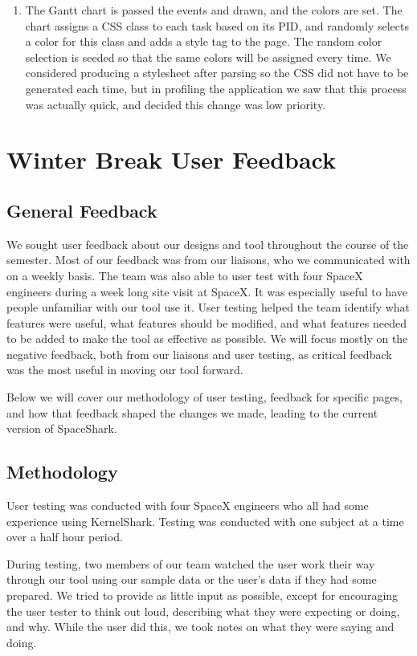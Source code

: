 \documentclass{hmcclinic}
\begin{document}
\begin{enumerate}
   \item The Gantt chart is passed the events and drawn, and the colors are set.
     The chart assigns a CSS class to each task based on its PID, and randomly
     selects a color for this class and adds a style tag to the page. The random
     color selection is seeded so that the same colors will be assigned every
     time. We considered producing a stylesheet after parsing so the CSS did not have
     to be generated each time, but in profiling the application we saw that
     this process was actually quick, and decided this change was low
     priority.

  \end{enumerate}


\chapter{Winter Break User Feedback} %
\section{General Feedback} %
We sought user feedback about our designs and tool throughout the course of the
semester. Most of our feedback was from our liaisons, who we communicated with
on a weekly basis. The team was also able to user test with four SpaceX
engineers during a week long site visit at SpaceX. It was especially useful to
have people unfamiliar with our tool use it.  User testing helped the team
identify what features were useful, what features should be modified, and what
features needed to be added to make the tool as effective as possible.  We will
focus mostly on the negative feedback, both from our liaisons and user testing,
as critical feedback was the most useful in moving our tool forward.

Below we will cover our methodology of user testing, feedback for specific
pages, and how that feedback shaped the changes we made, leading to the current
version of SpaceShark.

\section{Methodology} %
User testing was conducted with four SpaceX engineers who all had some
experience using KernelShark. Testing was conducted with one subject
at a time over a half hour period.

During testing, two members of our team watched the user work their way through
our tool using our sample data or the user's data if they had some prepared. We
tried to provide as little input as possible, except for encouraging the user
tester to think out loud, describing what they were expecting or doing, and why.
While the user did this, we took notes on what they were saying and doing.
\end{document}
